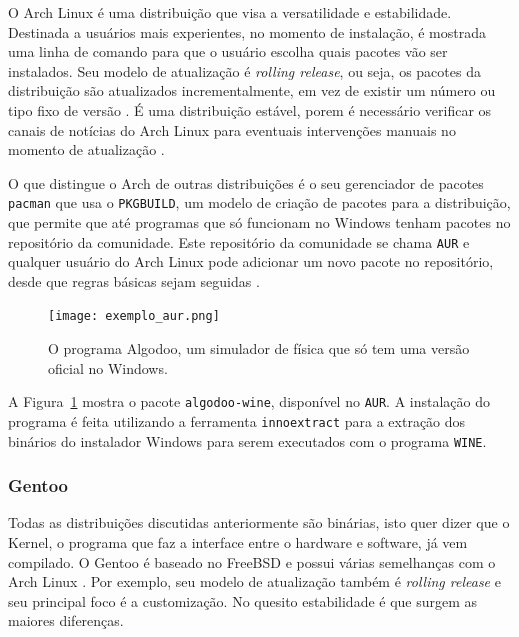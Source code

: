 \documentclass[
article,			%
12pt,				%
openright,			%
oneside,			%
a4paper,			%
chapter=TITLE,		%
section=TITLE,		%
subsection=TITLE,	%
subsubsection=TITLE,%
subsubsubsection=TITLE, %
english,			%
brazil,				%
]{abntex2}
\def\code#1{\texttt{#1}}
\begin{document}
O Arch Linux é uma distribuição que visa a versatilidade e
estabilidade. Destinada a usuários mais experientes, no momento de
instalação, é mostrada uma linha de comando para que o usuário escolha
quais pacotes vão ser instalados. Seu modelo de atualização é
\emph{rolling release}, ou seja, os pacotes da distribuição são
atualizados incrementalmente, em vez de existir um número ou tipo fixo
de versão \cite{ArchWiki2018a}. É uma distribuição estável, porem é
necessário verificar os canais de notícias do Arch Linux para
eventuais intervenções manuais no momento de atualização
\cite{ArchWiki2018c}.

O que distingue o Arch de outras distribuições é o seu gerenciador de
pacotes \code{pacman} que usa o \code{PKGBUILD}, um modelo de criação
de pacotes para a distribuição, que permite que até programas que só
funcionam no Windows tenham pacotes no repositório da comunidade. Este
repositório da comunidade se chama \code{AUR} e qualquer usuário do
Arch Linux pode adicionar um novo pacote no repositório, desde que
regras básicas sejam seguidas \cite{ArchWiki2018d}.

\begin{figure}[H]
    \caption{\label{fig:exemplo-aur}O programa Algodoo, um simulador
    de física que só tem uma versão oficial no Windows.}
    \begin{center}
        \texttt{[image: exemplo\_aur.png]}
    \end{center}
\end{figure}

A Figura~\ref{fig:exemplo-aur} mostra o pacote \code{algodoo-wine},
disponível no \code{AUR}. A instalação do programa é feita utilizando
a ferramenta \code{innoextract} para a extração dos binários do
instalador Windows para serem executados com o programa \code{WINE}.

\subsubsection{Gentoo}

Todas as distribuições discutidas anteriormente são binárias, isto
quer dizer que o Kernel, o programa que faz a interface entre o
hardware e software, já vem compilado. O Gentoo é baseado no FreeBSD e
possui várias semelhanças com o Arch Linux \cite{GentooFundation2018}.
Por exemplo, seu modelo de atualização também é \emph{rolling release}
e seu principal foco é a customização. No quesito estabilidade é que
surgem as maiores diferenças.
\end{document}
